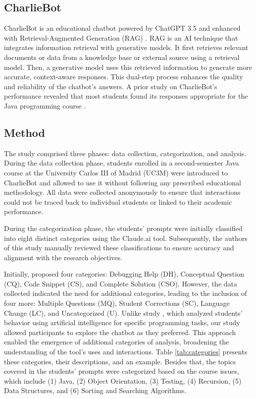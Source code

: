 \documentclass[a4paper,twoside]{article}
\begin{document}
\subsection{CharlieBot}

CharlieBot is an educational chatbot powered by ChatGPT 3.5 and enhanced with
Retrieval-Augmented Generation (RAG) \citep{Sun24}. RAG is an AI technique that
integrates information retrieval with generative models. It first retrieves
relevant documents or data from a knowledge base or external source using a
retrieval model. Then, a generative model uses this retrieved information to
generate more accurate, context-aware responses. This dual-step process enhances
the quality and reliability of the chatbot's answers. A prior study on
CharlieBot's performance revealed that most students found its responses
appropriate for the Java programming course \citep{Hoyos24}.

\subsection{Method}

The study comprised three phases: data collection, categorization, and analysis.
During the data collection phase, students enrolled in a second-semester Java
course at the University Carlos III of Madrid (UC3M) were introduced to
CharlieBot and allowed to use it without following any prescribed educational
methodology. All data were collected anonymously to ensure that interactions
could not be traced back to individual students or linked to their academic
performance.

During the categorization phase, the students' prompts were initially classified
into eight distinct categories using the Claude.ai \citep{claude} tool.
Subsequently, the authors of this study manually reviewed these classifications
to ensure accuracy and alignment with the research objectives.

Initially, \cite{Ghimire24} proposed four categories: Debugging Help (DH),
Conceptual Question (CQ), Code Snippet (CS), and Complete Solution (CSO).
However, the data collected indicated the need for additional categories,
leading to the inclusion of four more: Multiple Questions (MQ), Student
Corrections (SC), Language Change (LC), and Uncategorized (U). Unlike study
\cite{Ghimire24}, which analyzed students' behavior using artificial
intelligence for specific programming tasks, our study allowed participants to
explore the chatbot as they preferred. This approach enabled the emergence of
additional categories of analysis, broadening the understanding of the tool's
uses and interactions. Table \ref{tab:categories} presents these categories,
their descriptions, and an example. Besides that, the topics covered in the
students' prompts were categorized based on the course issues, which include
(1) Java, (2) Object Orientation, (3) Testing, (4) Recursion, (5) Data
Structures, and (6) Sorting and Searching Algorithms.
\end{document}

